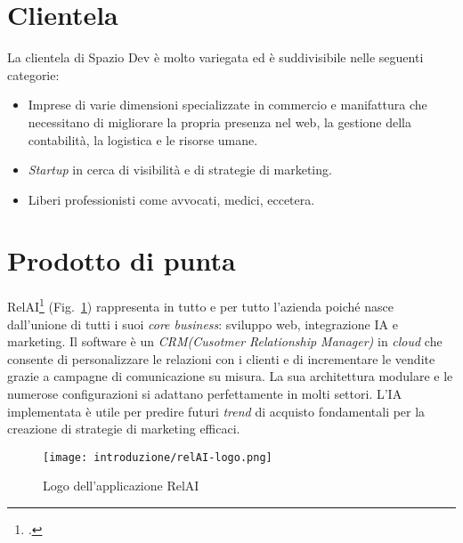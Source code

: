 \section{Clientela}
La clientela di Spazio Dev è molto variegata ed è suddivisibile nelle seguenti categorie:
\begin{itemize}
  \item Imprese di varie dimensioni specializzate in commercio e manifattura che necessitano di migliorare la propria presenza nel web, la gestione della contabilità, la logistica e le risorse umane.
  \item \emph{Startup} in cerca di visibilità e di strategie di marketing.
  \item Liberi professionisti come avvocati, medici, eccetera.
\end{itemize}



\section{Prodotto di punta}
RelAI\footcite{site:relai} (Fig.~\ref{fig:logo-RelAI}) rappresenta in tutto e per tutto l'azienda poiché nasce dall'unione di tutti i suoi \emph{core business}: sviluppo web, integrazione IA e marketing.
Il software è un \emph{\gls{CRM}\glsfirstoccur (Cusotmer Relationship Manager)}  in \emph{cloud} che consente di personalizzare le relazioni con i clienti e di incrementare le vendite grazie a campagne di comunicazione su misura.
La sua architettura modulare e le numerose configurazioni si adattano perfettamente in molti settori. L'IA implementata è utile per predire futuri \emph{trend} di acquisto fondamentali per la creazione di strategie di marketing efficaci. 


\begin{figure}[!h] 
  \centering 
  \texttt{[image: introduzione/relAI-logo.png]} 
  \caption{Logo dell'applicazione RelAI}
  \label{fig:logo-RelAI}
\end{figure}


